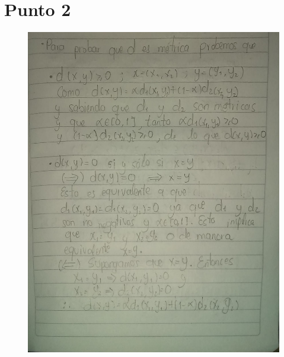 \documentclass[fleqn]{article}
\begin{document}
\section*{Punto 2}
\begin{figure}[H]
    \centering
    \includegraphics[page=1,width=\linewidth]{src/figs/punto2.pdf}
\end{figure}
\end{document}
